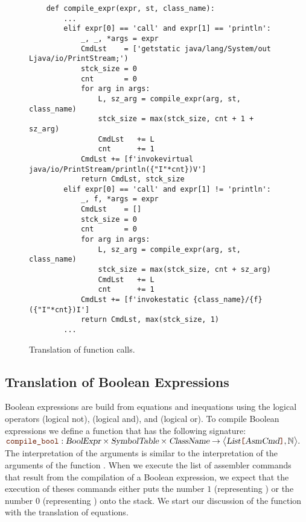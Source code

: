 \begin{figure}[!ht]
\centering
\begin{verbatim}
    def compile_expr(expr, st, class_name):
        ...
        elif expr[0] == 'call' and expr[1] == 'println':
            _, _, *args = expr
            CmdLst    = ['getstatic java/lang/System/out Ljava/io/PrintStream;')
            stck_size = 0
            cnt       = 0
            for arg in args:
                L, sz_arg = compile_expr(arg, st, class_name)
                stck_size = max(stck_size, cnt + 1 + sz_arg)
                CmdLst   += L
                cnt      += 1
            CmdLst += [f'invokevirtual java/io/PrintStream/println({"I"*cnt})V']
            return CmdLst, stck_size
        elif expr[0] == 'call' and expr[1] != 'println':
            _, f, *args = expr
            CmdLst    = []
            stck_size = 0
            cnt       = 0
            for arg in args:
                L, sz_arg = compile_expr(arg, st, class_name)
                stck_size = max(stck_size, cnt + sz_arg)
                CmdLst   += L
                cnt      += 1
            CmdLst += [f'invokestatic {class_name}/{f}({"I"*cnt})I']
            return CmdLst, max(stck_size, 1)
        ...
\end{verbatim}
\vspace*{-0.3cm}
\caption{Translation of function calls.}
\label{fig:Compiler.ipynb:compile:call}
\end{figure}

\subsection{Translation of Boolean Expressions}
Boolean expressions are build from equations and inequations using the logical operators
\qote{!} (logical not), \qote{\&\&} (logical and), and \qote{||} (logical or).
To compile Boolean expressions we define a function
 that has the following signature:
\\[0.2cm]
\hspace*{1.3cm}
$\mytt{compile\_bool}: \textsl{BoolExpr} \times \textsl{SymbolTable} \times \textsl{ClassName} \rightarrow 
                 \bigl\langle\textsl{List}\mytt{[}\textsl{AsmCmd}\mytt{]}, \mathbb{N}\bigr\rangle.$
\\[0.2cm]
The interpretation of the arguments is similar to the interpretation of the arguments
of the function .  
When we execute the list of assembler commands that result from the compilation of a Boolean expression, we
expect that the execution of theses commands either puts the number $1$ (representing ) or the
number $0$ (representing ) onto the stack. 
We start our discussion of the function  with the translation of equations.

